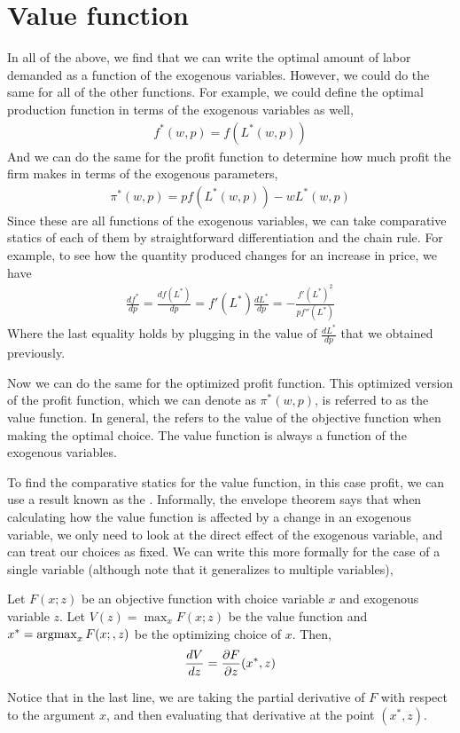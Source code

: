 \section{Value function}
In all of the above, we find that we can write the optimal amount of labor demanded as a function of the exogenous variables. However, we could do the same for all of the other functions. For example, we could define the optimal production function in terms of the exogenous variables as well,
\begin{align*}
    f^*(w, p) = f(L^*(w, p))
\end{align*}
And we can do the same for the profit function to determine how much profit the firm makes in terms of the exogenous parameters,
\begin{align*}
    \pi^*(w, p) = p f(L^*(w, p)) - w L^*(w, p)
\end{align*}
Since these are all functions of the exogenous variables, we can take comparative statics of each of them by straightforward differentiation and the chain rule. For example, to see how the quantity produced changes for an increase in price, we have
\begin{align*}
    \frac{df^*}{dp} = \frac{d f(L^*)}{dp} = f'(L^*) \frac{dL^*}{dp} = -\frac{f'(L^*)^2}{p f''(L^*)}
\end{align*}
Where the last equality holds by plugging in the value of $\frac{dL^*}{dp}$ that we obtained previously. 

Now we can do the same for the optimized profit function. This optimized version of the profit function, which we can denote as $\pi^*(w, p)$, is referred to as the value function. In general, the  refers to the value of the objective function when making the optimal choice. The value function is always a function of the exogenous variables. 

To find the comparative statics for the value function, in this case profit, we can use a result known as the . Informally, the envelope theorem says that when calculating how the value function is affected by a change in an exogenous variable, we only need to look at the direct effect of the exogenous variable, and can treat our choices as fixed. We can write this more formally for the case of a single variable (although note that it generalizes to multiple variables),

\begin{theorem*}[Envelope] \label{thm:envelope}
    Let $F(x; z)$ be an objective function with choice variable $x$ and exogenous variable $z$. Let $V(z) = \max_x F(x; z)$ be the value function and $x^* = \operatorname*{arg max}_x F(x;, z)$ be the optimizing choice of $x$. Then,
    \begin{align*}
        \frac{dV}{dz} = \frac{\partial F}{\partial z}(x^*, z)
    \end{align*}
\end{theorem*}
Notice that in the last line, we are taking the partial derivative of $F$ with respect to the argument $x$, and then evaluating that derivative at the point $(x^*, z)$. 

